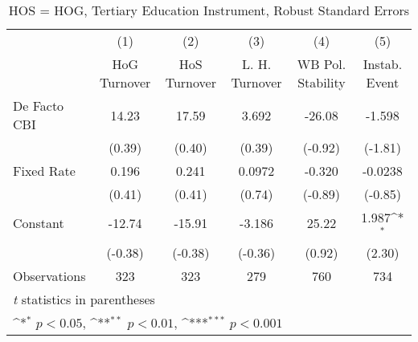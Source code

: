 \begin{table}[htbp]\centering
\def\sym#1{\ifmmode^{#1}\else\(^{#1}\)\fi}
\caption{HOS = HOG, Tertiary Education Instrument, Robust Standard Errors \label{hoshogfivs2}}
\begin{tabular}{l*{5}{c}}
\toprule
                                        &\multicolumn{1}{c}{(1)}&\multicolumn{1}{c}{(2)}&\multicolumn{1}{c}{(3)}&\multicolumn{1}{c}{(4)}&\multicolumn{1}{c}{(5)}\\
                                        &\multicolumn{1}{c}{HoG Turnover}&\multicolumn{1}{c}{HoS Turnover}&\multicolumn{1}{c}{L. H. Turnover}&\multicolumn{1}{c}{WB Pol. Stability}&\multicolumn{1}{c}{Instab. Event}\\
\midrule
De Facto CBI                            &    14.23         &    17.59         &    3.692         &   -26.08         &   -1.598         \\
                                        &   (0.39)         &   (0.40)         &   (0.39)         &  (-0.92)         &  (-1.81)         \\
\addlinespace
Fixed Rate                              &    0.196         &    0.241         &   0.0972         &   -0.320         &  -0.0238         \\
                                        &   (0.41)         &   (0.41)         &   (0.74)         &  (-0.89)         &  (-0.85)         \\
\addlinespace
Constant                                &   -12.74         &   -15.91         &   -3.186         &    25.22         &    1.987\sym{*}  \\
                                        &  (-0.38)         &  (-0.38)         &  (-0.36)         &   (0.92)         &   (2.30)         \\
\midrule
Observations                            &      323         &      323         &      279         &      760         &      734         \\
\bottomrule
\multicolumn{6}{l}{\footnotesize \textit{t} statistics in parentheses}\\
\multicolumn{6}{l}{\footnotesize \sym{*} \(p<0.05\), \sym{**} \(p<0.01\), \sym{***} \(p<0.001\)}\\
\end{tabular}
\end{table}
